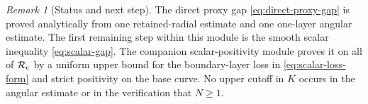 \documentclass[11pt]{article}
\theoremstyle{remark}
\newtheorem{remark}[lemma]{Remark}
\begin{document}
\begin{remark}[Status and next step]
The direct proxy gap \eqref{eq:direct-proxy-gap} is proved analytically from
one retained-radial estimate and one one-layer angular estimate.  The first
remaining step within this module is the smooth scalar inequality
\eqref{eq:scalar-gap}.  The companion scalar-positivity module proves it on
all of $\mathcal R_{\rm c}$ by a uniform upper bound for the boundary-layer
loss in \eqref{eq:scalar-loss-form} and strict positivity on the base curve.
No upper cutoff in $K$ occurs in the angular estimate or in the verification
that $N\geq1$.
\end{remark}
\end{document}
